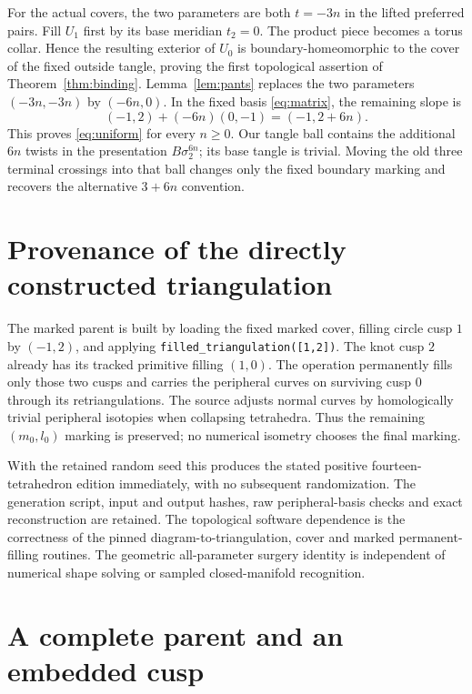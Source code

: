 \documentclass[11pt]{article}
\begin{document}
For the actual covers, the two parameters are both $t=-3n$ in the
lifted preferred pairs. Fill $U_1$ first by its base meridian $t_2=0$.
The product piece becomes a torus collar. Hence the resulting exterior
of $U_0$ is boundary-homeomorphic to the cover of the fixed outside
tangle, proving the first topological assertion of
Theorem~\ref{thm:binding}. Lemma~\ref{lem:pants} replaces the two
parameters $(-3n,-3n)$ by $(-6n,0)$. In the fixed basis
\eqref{eq:matrix}, the remaining slope is
\[
 (-1,2)+(-6n)(0,-1)=(-1,2+6n).
\]
This proves \eqref{eq:uniform} for every $n\ge0$.
Our tangle ball contains the additional $6n$ twists in the presentation
$B\sigma_2^{6n}$; its base tangle is trivial. Moving the old three
terminal crossings into that ball changes only the fixed boundary
marking and recovers the alternative $3+6n$ convention.

\section{Provenance of the directly constructed triangulation}

The marked parent is built
by loading the fixed marked cover, filling circle cusp $1$ by $(-1,2)$,
and applying \texttt{filled\_triangulation([1,2])}. The knot cusp $2$
already has its tracked primitive filling $(1,0)$. The operation
permanently fills only those two cusps and carries the peripheral
curves on surviving cusp $0$ through its retriangulations. The source
adjusts normal curves by homologically trivial peripheral isotopies
when collapsing tetrahedra. Thus the remaining $(m_0,l_0)$ marking
is preserved; no numerical isometry chooses the final marking.

With the retained random seed this produces the stated positive
fourteen-tetrahedron edition immediately, with no subsequent
randomization. The generation script, input and output hashes, raw
peripheral-basis checks and exact reconstruction are retained.
The topological software dependence is the correctness of
the pinned diagram-to-triangulation, cover and marked permanent-filling
routines. The geometric all-parameter surgery identity is independent
of numerical shape solving or sampled closed-manifold recognition.

\section{A complete parent and an embedded cusp}
\end{document}

